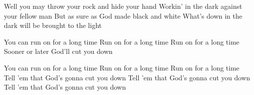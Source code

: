     \beginverse
        Well you may throw your rock and hide your hand
        Workin' in the dark against your fellow man
        But as sure as God made black and white
        What's down in the dark will be brought to the light
    \endverse

    \beginchorus
        You can run on for a long time
        Run on for a long time
        Run on for a long time
        Sooner or later God'll cut you down
    \endchorus

    \beginchorus
        You can run on for a long time
        Run on for a long time
        Run on for a long time
        Tell 'em that God's gonna cut you down
        Tell 'em that God's gonna cut you down
        Tell 'em that God's gonna cut you down
    \endchorus
\endsong
